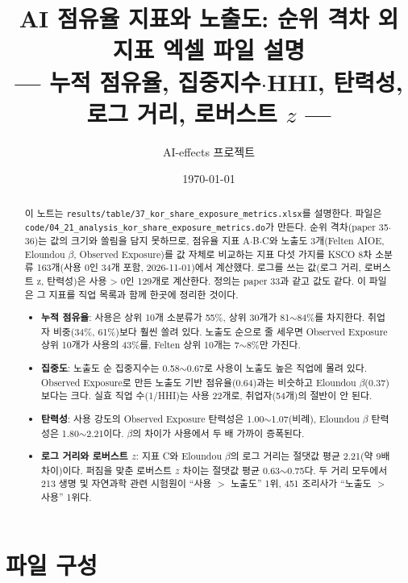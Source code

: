 \documentclass[11pt]{article}
\title{AI 점유율 지표와 노출도: 순위 격차 외 지표 엑셀 파일 설명\\[2mm]
\large --- 누적 점유율, 집중지수$\cdot$HHI, 탄력성, 로그 거리, 로버스트 $z$ ---}
\author{AI-effects 프로젝트}
\date{\today}
\begin{document}
\maketitle

\begin{abstract}
\noindent 이 노트는 \texttt{results/table/37\_kor\_share\_exposure\_metrics.xlsx}를 설명한다. 파일은 \texttt{code/04\_21\_analysis\_kor\_share\_exposure\_metrics.do}가 만든다. 순위 격차(paper 35$\cdot$36)는 값의 크기와 쏠림을 담지 못하므로, 점유율 지표 A$\cdot$B$\cdot$C와 노출도 3개(Felten AIOE\parencite{felten-2023-how-will-language-modelers-like-chatgpt}, Eloundou $\beta$\parencite{eloundou-2023-gpts-are-gpts-an-early}, Observed Exposure\parencite{massenkoff-2026-labor-market-impacts-of-ai})를 값 자체로 비교하는 지표 다섯 가지를 KSCO 8차 소분류 163개(사용 0인 34개 포함, 2026-11-01)에서 계산했다. 로그를 쓰는 값(로그 거리, 로버스트 z, 탄력성)은 사용 > 0인 129개로 계산한다. 정의는 paper 33과 같고 값도 같다. 이 파일은 그 지표를 직업 목록과 함께 한곳에 정리한 것이다.
\begin{itemize}[leftmargin=*]
  \item \textbf{누적 점유율}: 사용은 상위 10개 소분류가 55\%, 상위 30개가 81$\sim$84\%를 차지한다. 취업자 비중(34\%, 61\%)보다 훨씬 쏠려 있다. 노출도 순으로 줄 세우면 Observed Exposure 상위 10개가 사용의 43\%를, Felten 상위 10개는 7$\sim$8\%만 가진다.
  \item \textbf{집중도}: 노출도 순 집중지수는 0.58$\sim$0.67로 사용이 노출도 높은 직업에 몰려 있다. Observed Exposure로 만든 노출도 기반 점유율(0.64)과는 비슷하고 Eloundou $\beta$(0.37)보다는 크다. 실효 직업 수(1/HHI)는 사용 22개로, 취업자(54개)의 절반이 안 된다.
  \item \textbf{탄력성}: 사용 강도의 Observed Exposure 탄력성은 1.00$\sim$1.07(비례), Eloundou $\beta$ 탄력성은 1.80$\sim$2.21이다. $\beta$의 차이가 사용에서 두 배 가까이 증폭된다.
  \item \textbf{로그 거리와 로버스트 $z$}: 지표 C와 Eloundou $\beta$의 로그 거리는 절댓값 평균 2.21(약 9배 차이)이다. 퍼짐을 맞춘 로버스트 $z$ 차이는 절댓값 평균 0.63$\sim$0.75다. 두 거리 모두에서 213 생명 및 자연과학 관련 시험원이 ``사용 $>$ 노출도'' 1위, 451 조리사가 ``노출도 $>$ 사용'' 1위다.
\end{itemize}
\end{abstract}

\section{파일 구성}
\end{document}
